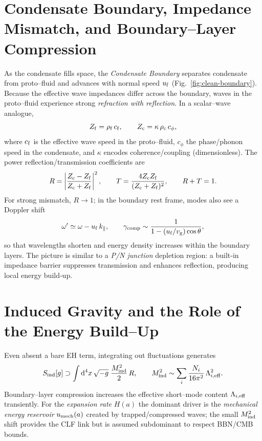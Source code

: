 \documentclass[11pt,a4paper]{article}
\newcommand{\be}{\begin{equation}}
\newcommand{\ee}{\end{equation}}
\newcommand{\dx}{\mathrm{d}}
\begin{document}
\section{Condensate Boundary, Impedance Mismatch, and Boundary--Layer Compression}
As the condensate fills space, the \emph{Condensate Boundary} separates condensate from proto--fluid and advances with normal speed $u_{\rm f}$ (Fig.~\ref{fig:clean-boundary}). Because the effective wave impedances differ across the boundary, waves in the proto--fluid experience strong \emph{refraction with reflection}. In a scalar--wave analogue,
\be
Z_{\rm f}=\rho_{\rm f}\,c_{\rm f},\qquad
Z_{\rm c}=\kappa\,\rho_{\rm c}\,c_{\phi},
\ee
where $c_{\rm f}$ is the effective wave speed in the proto--fluid, $c_{\phi}$ the phase/phonon speed in the condensate, and $\kappa$ encodes coherence/coupling (dimensionless). The power reflection/transmission coefficients are
\be
R=\left|\frac{Z_{\rm c}-Z_{\rm f}}{Z_{\rm c}+Z_{\rm f}}\right|^{2},\qquad
T=\frac{4 Z_{\rm c}Z_{\rm f}}{(Z_{\rm c}+Z_{\rm f})^{2}},\qquad R+T=1.
\label{eq:RT}
\ee
For strong mismatch, $R\to 1$; in the boundary rest frame, modes also see a Doppler shift
\be
\omega' \simeq \omega - u_{\rm f}\,k_\parallel,\qquad
\gamma_{\rm comp} \sim \frac{1}{1-(u_{\rm f}/v_{\rm g})\cos\theta},
\ee
so that wavelengths shorten and energy density increases within the boundary layers. The picture is similar to a \emph{P/N junction} depletion region: a built‑in impedance barrier suppresses transmission and enhances reflection, producing local energy build‑up.

\section{Induced Gravity and the Role of the Energy Build--Up}
Even absent a bare EH term, integrating out fluctuations generates
\be
S_{\rm ind}[g]\supset \int \dx^4x\,\sqrt{-g}\;\frac{M_{\rm ind}^2}{2}\,R,\qquad
M_{\rm ind}^2\sim \sum_i \frac{N_i}{16\pi^2}\,\Lambda_{i,\rm eff}^2.
\ee
Boundary--layer compression increases the effective short--mode content $\Lambda_{i,\rm eff}$ transiently. For the \emph{expansion rate} $H(a)$ the dominant driver is the \emph{mechanical energy reservoir} $u_{\rm mech}(a)$ created by trapped/compressed waves; the small $M_{\rm ind}^2$ shift provides the CLF link but is assumed subdominant to respect BBN/CMB bounds.
\end{document}
